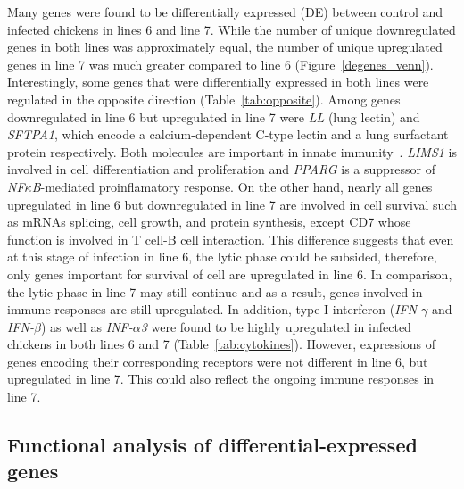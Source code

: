 \documentclass[10pt]{article}
\begin{document}
Many genes were found to be differentially expressed (DE) between control and
infected chickens in lines 6 and line 7.  While the number of unique
downregulated genes in both lines was approximately equal, the number of unique
upregulated genes in line 7 was much greater compared to line 6
(Figure~\ref{degenes_venn}).  Interestingly, some genes
that were differentially expressed in both lines were regulated in the opposite
direction (Table~\ref{tab:opposite}).  Among genes downregulated in line 6 but
upregulated in line 7 were {\em LL} (lung lectin) and {\em SFTPA1}, which encode
a calcium-dependent C-type lectin and a lung surfactant protein respectively.
Both molecules are important in innate
immunity~\cite{hogenkamp2008chicken,kingma2006defense}.  {\em LIMS1} is involved
in cell differentiation and proliferation and {\em PPARG} is a suppressor of
{\em NF$\kappa$B}-mediated proinflamatory response.  On the other hand, nearly
all genes upregulated in line 6 but downregulated in line 7 are involved in cell
survival such as mRNAs splicing, cell growth, and protein synthesis, except CD7
whose function is involved in T cell-B cell interaction.  This difference
suggests that even at this stage of infection in line 6, the lytic phase could
be subsided, therefore, only genes important for survival of cell are
upregulated in line 6.  In comparison, the lytic phase in line 7 may still
continue and as a result, genes involved in immune responses are still
upregulated.  In addition, type I interferon ({\em IFN-$\gamma$} and {\em
IFN-$\beta$}) as well as {\em INF-$\alpha$3} were found to be highly upregulated
in infected chickens in both lines 6 and 7 (Table~\ref{tab:cytokines}).
However, expressions of genes encoding their corresponding receptors were not
different in line 6, but upregulated in line 7.  This could also reflect the
ongoing immune responses in line 7.


\subsection*{Functional analysis of differential-expressed genes}
\end{document}
